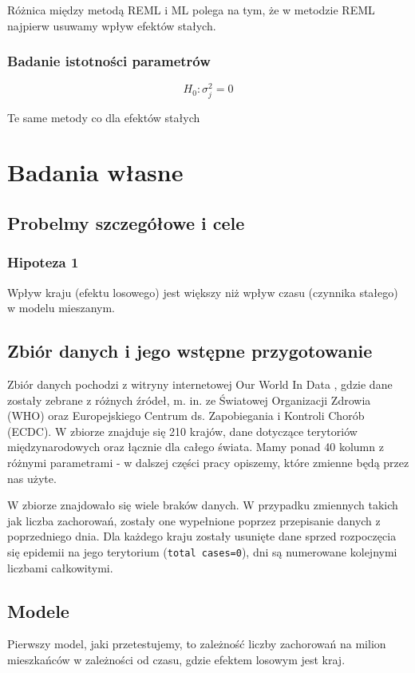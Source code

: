 \documentclass[12pt]{mwbk}
\theoremstyle{plain}
\theoremstyle{definition}
\theoremstyle{remark}
\begin{document}
Różnica między metodą REML i ML polega na tym, że w metodzie REML najpierw usuwamy wpływ efektów stałych.

\subsection{Badanie istotności parametrów}

$$H_0: \sigma^2_j=0$$

Te same metody co dla efektów stałych

\chapter{Badania własne}
\section{Probelmy szczegółowe i cele}
\subsection{Hipoteza 1}
Wpływ kraju (efektu losowego) jest większy niż wpływ czasu (czynnika stałego) w modelu mieszanym.
\section{Zbiór danych i jego wstępne przygotowanie}

Zbiór danych pochodzi z witryny internetowej Our World In Data \cite{owid}, gdzie dane zostały zebrane z różnych źródeł, m. in. ze Światowej Organizacji Zdrowia (WHO) oraz Europejskiego Centrum ds. Zapobiegania i Kontroli Chorób (ECDC). W zbiorze znajduje się 210 krajów, dane dotyczące terytoriów międzynarodowych oraz łącznie dla całego świata. Mamy ponad 40 kolumn z różnymi parametrami - w dalszej części pracy opiszemy, które zmienne będą przez nas użyte.

W zbiorze znajdowało się wiele braków danych. W przypadku zmiennych takich jak liczba zachorowań, zostały one wypełnione poprzez przepisanie danych z poprzedniego dnia. Dla każdego kraju zostały usunięte dane sprzed rozpoczęcia się epidemii na jego terytorium (\texttt{total cases=0}), dni są numerowane kolejnymi liczbami całkowitymi.
\section{Modele}

Pierwszy model, jaki przetestujemy, to zależność liczby zachorowań na milion mieszkańców w zależności od czasu, gdzie efektem losowym jest kraj.
\end{document}

